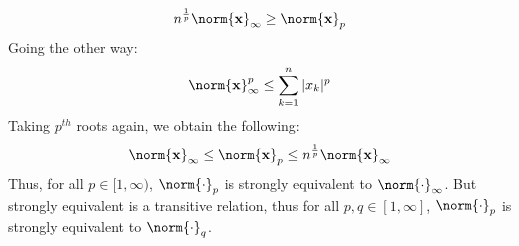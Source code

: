 \begin{solution}[1]
\begin{equation}
                n^{\frac{1}{p}}\norm{\mathbf{x}}_{\infty}
                \geq\norm{\mathbf{x}}_{p}
            \end{equation}
            Going the other way:
            \begin{equation}
                \norm{\mathbf{x}}_{\infty}^{p}\leq
                \sum_{k=1}^{n}|x_{k}|^{p}
            \end{equation}
            Taking $p^{th}$ roots again, we obtain the following:
            \begin{equation}
                \norm{\mathbf{x}}_{\infty}\leq\norm{\mathbf{x}}_{p}
                \leq{n}^{\frac{1}{p}}\norm{\mathbf{x}}_{\infty}
            \end{equation}
            Thus, for all $p\in[1,\infty)$, $\norm{\cdot}_{p}$
            is strongly equivalent to $\norm{\cdot}_{\infty}$.
            But strongly equivalent is a transitive relation,
            thus for all $p,q\in[1,\infty]$, $\norm{\cdot}_{p}$
            is strongly equivalent to $\norm{\cdot}_{q}$.
        \end{solution}
